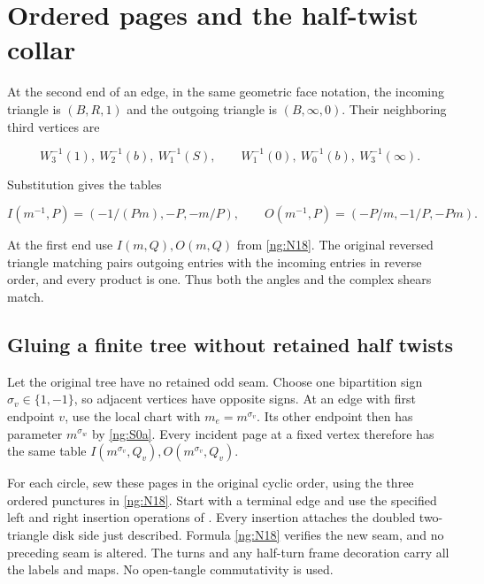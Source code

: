 \section{Ordered pages and the half-twist collar}\label{ng:ordered-pages-and-the-half-twist-collar}

At the second end of an edge, in the same geometric face notation,
the incoming triangle is \((B,R,1)\) and the outgoing triangle
is \((B,\infty,0)\). Their neighboring third vertices are

\begin{equation}\label{ng:S0}
W_3^{-1}(1),\ W_2^{-1}(b),\ W_1^{-1}(S),\qquad
 W_1^{-1}(0),\ W_0^{-1}(b),\ W_3^{-1}(\infty).
\end{equation}

Substitution gives the tables

\begin{equation}\label{ng:S0a}
I(m^{-1},P)=(-1/(Pm),-P,-m/P),\qquad
 O(m^{-1},P)=(-P/m,-1/P,-Pm).
\end{equation}

At the first end use \(I(m,Q),O(m,Q)\) from \eqref{ng:N18}.
The original reversed triangle matching pairs outgoing entries with
the incoming entries in reverse order, and every product is one.
Thus both the angles and the complex shears match.

\subsection{Gluing a finite tree without retained half twists}\label{ng:an-arbitrary-finite-pure-page-tree}

Let the original tree have no retained odd seam. Choose one
bipartition sign \(\sigma_v\in\{1,-1\}\), so adjacent
vertices have opposite signs. At an edge with first endpoint
\(v\), use the local chart with \(m_e=m^{\sigma_v}\).
Its other endpoint then has parameter \(m^{\sigma_w}\) by
\eqref{ng:S0a}. Every incident page at a fixed vertex therefore has the
same table \(I(m^{\sigma_v},Q_v),O(m^{\sigma_v},Q_v)\).

For each circle, sew these pages in the original cyclic order,
using the three ordered punctures in \eqref{ng:N18}. Start with a terminal
edge and use the specified left and right insertion operations of
\cite[Proposition~2.1, equations~(2.2) and~(2.4)]{Circle}. Every insertion attaches the doubled
two-triangle disk side just described. Formula \eqref{ng:N18} verifies the
new seam, and no preceding seam is altered. The turns
and any half-turn frame decoration carry all the labels and maps.
No open-tangle commutativity is used.

